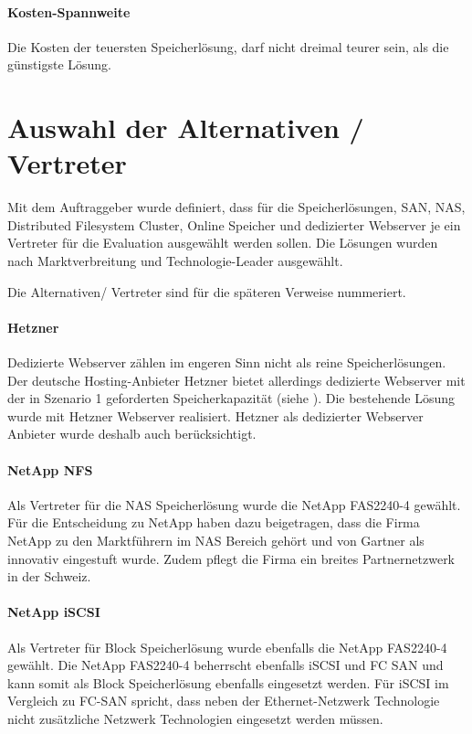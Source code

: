 \paragraph{Kosten-Spannweite}\label{KO-3}
Die Kosten der teuersten Speicherlösung, darf nicht dreimal teurer sein, als die günstigste Lösung.

\section{Auswahl der Alternativen / Vertreter}
Mit dem Auftraggeber wurde definiert, dass für die Speicherlösungen, SAN, NAS, Distributed Filesystem Cluster, Online Speicher und dedizierter Webserver je ein Vertreter für die Evaluation ausgewählt werden sollen. Die Lösungen wurden nach Marktverbreitung und Technologie-Leader ausgewählt.

Die Alternativen/ Vertreter sind für die späteren Verweise nummeriert.

\renewcommand\theparagraph{Al-\arabic{paragraph}}
\setcounter{paragraph}{0}

\paragraph{Hetzner}\label{Al-1}
Dedizierte Webserver zählen im engeren Sinn nicht als reine Speicherlösungen. Der deutsche Hosting-Anbieter Hetzner bietet allerdings dedizierte Webserver mit der in Szenario 1 geforderten Speicherkapazität (siehe ). Die bestehende Lösung wurde mit Hetzner Webserver realisiert. Hetzner als dedizierter Webserver Anbieter wurde deshalb auch berücksichtigt. 

\paragraph{NetApp NFS}\label{Al-2}
Als Vertreter für die NAS Speicherlösung wurde die NetApp FAS2240-4 gewählt. Für die Entscheidung zu NetApp haben dazu beigetragen, dass die Firma NetApp zu den Marktführern im NAS Bereich gehört und von Gartner als innovativ eingestuft wurde. Zudem pflegt die Firma ein breites Partnernetzwerk in der Schweiz.

\paragraph{NetApp iSCSI}\label{Al-3}
Als Vertreter für Block Speicherlösung wurde ebenfalls die NetApp FAS2240-4 gewählt. Die NetApp FAS2240-4 beherrscht ebenfalls iSCSI und FC SAN und kann somit als Block Speicherlösung ebenfalls eingesetzt werden. Für iSCSI im Vergleich zu FC-SAN spricht, dass neben der Ethernet-Netzwerk Technologie nicht zusätzliche Netzwerk Technologien eingesetzt werden müssen.

